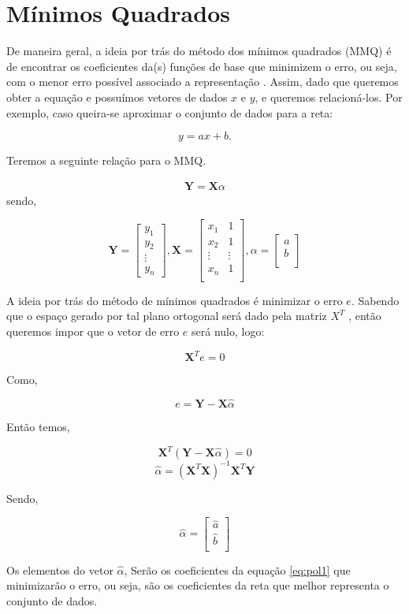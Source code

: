 \section{Mínimos Quadrados}
De maneira geral, a ideia por trás do método dos mínimos quadrados (MMQ)  é de encontrar os coeficientes da(s) funções de base que minimizem o erro, ou seja, com o menor erro possível associado a representação \cite{MMQ}. Assim, dado que queremos obter a equação e possuímos vetores de dados $x$ e $y$, e queremos relacioná-los. Por exemplo, caso queira-se aproximar o conjunto de dados para a reta:

\begin{equation}
    y = ax + b.
    \label{eq:pol1}
\end{equation}

Teremos a seguinte relação para o MMQ.

\begin{align*}
    \textbf{Y} = \textbf{X}\alpha
\end{align*}
sendo,

\begin{equation*}
    \textbf{Y} =
    \begin{bmatrix}
     y_1\\
     y_2\\
     \vdots\\
     y_n
    \end{bmatrix},
    \textbf{X} = 
    \begin{bmatrix}
        x_1 & 1\\
        x_2 & 1\\
        \vdots & \vdots\\
        x_n & 1\\
    \end{bmatrix},
    \alpha =
    \begin{bmatrix}
        a\\
        b\\
    \end{bmatrix}
\end{equation*}

A ideia por trás do método de mínimos quadrados é minimizar o erro $e$. Sabendo que o espaço gerado por tal plano ortogonal será dado pela matriz $X^T$ , então queremos impor que o vetor
de erro $e$ será nulo, logo:

\[\textbf{X}^Te = 0\]

Como,

\[e = \textbf{Y} - \textbf{X}\hat{\alpha}\]

Então temos,

\[\textbf{X}^T(\textbf{Y} - \textbf{X}\hat{\alpha})= 0\]
\[\hat{\alpha} = (\textbf{X}^T\textbf{X})^{-1}\textbf{X}^T\textbf{Y} \]

Sendo,

\[\hat{\alpha} = 
\begin{bmatrix}
 \hat{a}\\
 \hat{b}\\
\end{bmatrix}
\]

Os elementos do vetor $\hat{\alpha}$, Serão os coeficientes da equação \ref{eq:pol1} que minimizarão o erro, ou seja, são os coeficientes da reta que melhor representa o conjunto de dados.